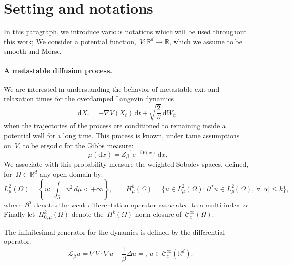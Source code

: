 \documentclass[10pt]{article}
\newcommand{\cL}{\mathcal{L}}
\renewcommand{\d}{\mathrm{d}}
\newcommand{\e}{\mathrm{e}}
\newcommand{\R}{\mathbb{R}}
\newcommand{\1}{\mathbbm 1}
\begin{document}
    \section{Setting and notations}
    In this paragraph, we introduce various notations which will be used throughout this work;
    We consider a potential function,~$V : \R^d \to \R$, which we assume to be smooth and Morse.

    \paragraph{A metastable diffusion process.}
    We are interested in understanding the behavior of metastable exit and relaxation times for the overdamped Langevin dynamics
    \begin{equation}
        \label{eq:overdamped_langevin}
        \d X_t = -\nabla V(X_t)\,\d t + \sqrt{\frac2\beta}\, \d W_t,
    \end{equation}
    when the trajectories of the process are conditioned to remaining inside a potential well for a long time.
    This process is known, under tame assumptions on~$V$, to be ergodic for the Gibbs measure:
    \[\mu(\d x) = Z_\beta^{-1}\e^{-\beta V(x)}\,\d x.\]
    We associate with this probability measure the weighted Sobolev spaces, defined, for~$\Omega\subset \R^d$ any open domain by:
    \begin{equation}
        \label{eq:sobolev_spaces}
        L_\mu^2(\Omega) = \left\{u:\,\int_{\Omega} u^2 \,d\mu < +\infty\right\},\qquad H^{k}_\mu(\Omega) = \{u\in L^2_\mu(\Omega):\,\partial^{\alpha}u\in L^2_\mu(\Omega),\,\forall\, |\alpha|\leq k\},
    \end{equation}
    where~$\partial^\alpha$ denotes the weak differentation operator associated to a multi-index~$\alpha$. Finally let~$H_{0,\mu}^k(\Omega)$ denote the~$H^k(\Omega)$ norm-closure of~$\mathcal C^\infty_c(\Omega)$.

    The infinitesimal generator for the dynamics is defined by the differential operator:
    \begin{equation}
        \label{eq:generator}
        -\cL_\beta u = \nabla V \cdot \nabla u - \frac1\beta \Delta u=,\, u \in \mathcal C^\infty_c(\R^d).
    \end{equation}
\end{document}
